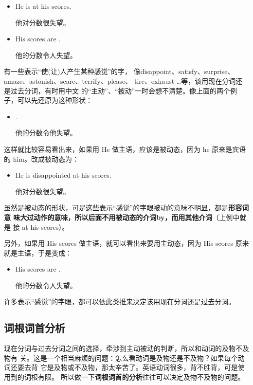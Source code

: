 \begin{itemize}
\item He is  at his scores.

  他对分数很失望。
\item His scores are .

  他的分数令人失望。
\end{itemize}

有一些表示“使(让)人产生某种感觉”的字，
像disappoint、satisfy、surprise、amaze、astonish、scare、terrify、please、
tire、exhaust \ldots{}等，该用现在分词还是过去分词，有时用中文
的“主动”、“被动”一时会想不清楚。像上面的两个例子，可以先还原为这种形状：

\begin{itemize}
\item {}  .

他的分数令他失望。
\end{itemize}
这样就比较容易看出来，如果用 He 做主语，应该是被动态，因为 he
原来是宾语的 him。改成被动态为：
\begin{itemize}
\item  He is disappointed at his scores.

  他对分数很失望。
\end{itemize}

虽然是被动态的形状，可是这些表示“感觉”的字眼被动的意味不明显，都是\textbf{形容词意
  味大过动作的意味，所以后面不用被动态的介词by，而用其他介词}（上例中就是
接 at his scores）。

另外，如果用 His scores 做主语，就可以看出来要用主动态，因为 His scores
原来就是主语，于是变成：
\begin{itemize}
\item His scores are .

  他的分数令人失望。
\end{itemize}

许多表示“感觉”的字眼，都可以依此类推来决定该用现在分词还是过去分词。

\subsection{词根词首分析}

现在分词与过去分词之间的选择，牵涉到主动被动的判断，所以和动词的及物不及物有
关。这是一个相当麻烦的问题：怎么看动词是及物还是不及物？如果每个动词还要去背
它是及物或不及物，那太辛苦了。英语动词很多，背不胜背，可是使用到的词根有限。
所以做一下\textbf{词根词首的分析}往往可以决定及物不及物的问题。

